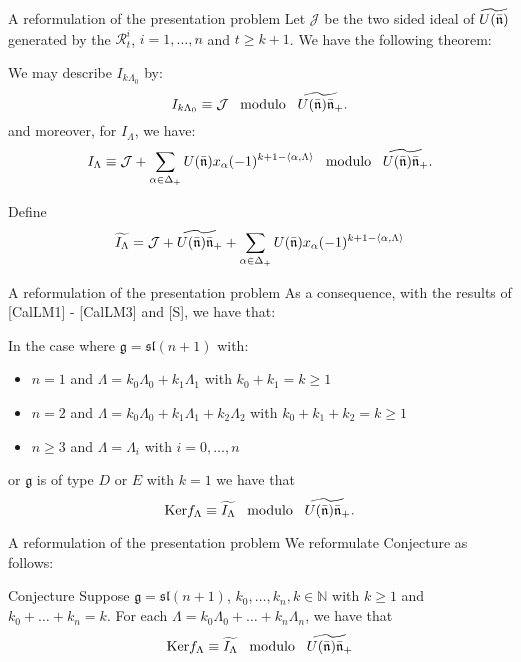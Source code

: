 \documentclass{beamer}
\begin{document}
\begin{frame}{A reformulation of the presentation problem}
  Let $\mathcal{J}$ be the
two sided ideal of $\widetilde{U(\bar{\frak{n}})}$ generated by the
$\mathcal{R}_t^i$, $i=1,\dots,n$ and $t \ge k+1$. We have the following theorem:
\begin{theorem}\label{compidealequivalence}
We may describe $I_{k\Lambda_0}$ by:
\begin{equation}
I_{k\Lambda_0} \equiv {\mathcal J} \; \; \;
\mbox{\rm modulo} \; \; \;
\widetilde{U(\bar{\frak{n}})\bar{\frak{n}}_{+}}.
\end{equation}
and moreover,
for  $I_\Lambda$, we have:
\begin{equation} \label{equation_2}
I_{\Lambda}\equiv {\mathcal J} + \sum_{\alpha \in \Delta_+}
U(\bar{\frak{n}})x_{\alpha}(-1)^{k+1-\langle \alpha , \Lambda \rangle}
\; \; \; \mbox{\rm modulo} \; \; \;
\widetilde{U(\bar{\frak{n}})\bar{\frak{n}}_{+}}.
\end{equation}
\end{theorem}
\pause
Define 
\begin{equation} \label{equation_2}
\widetilde{I_{\Lambda}}={\mathcal J} + 
\widetilde{U(\bar{\frak{n}})\bar{\frak{n}}_{+}} + \sum_{\alpha \in \Delta_+}
U(\bar{\frak{n}})x_{\alpha}(-1)^{k+1-\langle \alpha , \Lambda \rangle}
\end{equation}
\end{frame}

\begin{frame}{A reformulation of the presentation problem}
 As a consequence, with the
results of [CalLM1] - [CalLM3] and [S], we have that:
\begin{theorem}
In the case where $\mathfrak{g} = \mathfrak{sl}(n+1)$ with:
\begin{itemize}
\item $n=1$ and $\Lambda = k_0\Lambda_0 + k_1\Lambda_1$ with $k_0 + k_1 = k\ge 1$
\item$n=2$ and $\Lambda = k_0 \Lambda_0 + k_1\Lambda_1 + k_2\Lambda_2$  with $k_0 + k_1 + k_2 = k\ge 1$
\item $n\ge 3$ and $\Lambda = \Lambda_i$ with $i=0,\dots,n$
\end{itemize}
or $\mathfrak{g}$ is of type $D$ or $E$  
with $k=1$
 we have that 
$$\mbox{Ker}f_\Lambda \equiv \widetilde{I_\Lambda} \; \; \; \mbox{\rm
   modulo} \; \; \; \widetilde{U(\bar{\frak{n}})\bar{\frak{n}}_{+}}.$$
\end{theorem}

\end{frame}
\begin{frame}{A reformulation of the presentation problem}
We reformulate Conjecture as follows:
\begin{alertblock}{Conjecture}
Suppose $\mathfrak{g} = \mathfrak{sl}(n+1)$,
$k_0,\dots,k_n,k \in \mathbb{N}$ with $k \ge 1$ and $k_0 + \dots + k_n
= k$.  For each $\Lambda = k_0\Lambda_0 + \dots + k_n \Lambda_n$, we
have that
$$\mbox{Ker}f_\Lambda \equiv \widetilde{I_\Lambda}  \; \; \; \mbox{\rm modulo} \; \; \;
\widetilde{U(\bar{\frak{n}})\bar{\frak{n}}_{+}}$$
\end{alertblock}
\end{frame}
\end{document}
